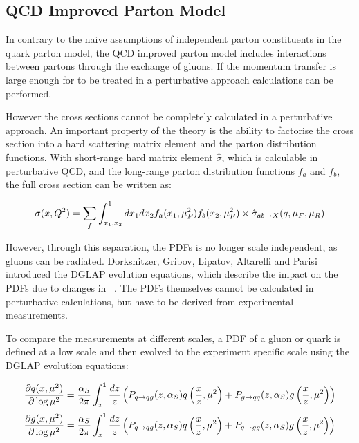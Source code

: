 \subsection{QCD Improved Parton Model}

In contrary to the naive assumptions of independent parton constituents in the quark parton model, the QCD improved parton model includes interactions between partons through the exchange of gluons. If the momentum transfer \q is large enough for \as to be treated in a perturbative approach calculations can be performed.

However the cross sections cannot be completely calculated in a perturbative approach. An important property of the theory is the ability to factorise the cross section into a hard scattering matrix element and the parton distribution functions. With short-range hard matrix element $\hat \sigma$, which is calculable in perturbative QCD, and the long-range parton distribution functions $f_a$ and $f_b$, the full cross section can be written as:

\begin{equation}
\sigma(x,Q^2) = \sum_f \int_{x_1,x_2}^1 dx_1 dx_2 f_a(x_1,\mu_F^2) f_b(x_2,\mu_F^2) \times \hat \sigma_{ab \rightarrow X} (q, \mu_F, \mu_R) 
\end{equation}


However, through this separation, the PDFs is no longer scale independent, as gluons can be radiated. Dorkshitzer, Gribov, Lipatov, Altarelli and Parisi introduced the DGLAP evolution equations, which describe the impact on the PDFs due to changes in \q~\cite{Dokshitzer:1977sg,Gribov:1972ri,Altarelli:1977zs}. The PDFs themselves cannot be calculated in perturbative calculations, but have to be derived from experimental measurements.
\vspace{\baselineskip}

To compare the measurements at different scales, a PDF of a gluon or quark is defined at a low scale and then evolved to the experiment specific scale using the DGLAP evolution equations:

\begin{equation}
\frac{\partial q(x,\mu^2)}{\partial \log \mu^2} = \frac{\alpha_S}{2 \pi} \int_x^1 \frac{dz}{z} \left( P_{q \rightarrow q g}(z,\alpha_S)q \left(\frac{x}{z},\mu^2 \right) + P_{g  \rightarrow q q}(z,\alpha_S)g \left(\frac{x}{z},\mu^2 \right) \right)
\end{equation}
\begin{equation}
\frac{\partial g(x,\mu^2)}{\partial \log \mu^2} = \frac{\alpha_S}{2 \pi} \int_x^1 \frac{dz}{z} \left( P_{q \rightarrow qg}(z,\alpha_S)q \left(\frac{x}{z},\mu^2 \right) + P_{q \rightarrow gg}(z,\alpha_S)g \left(\frac{x}{z},\mu^2 \right) \right)
\end{equation}

